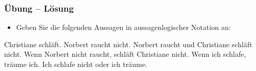 

\begin{frame}
\frametitle{Übung -- Lösung}

\begin{itemize}
	\item Geben Sie die folgenden Aussagen in aussagenlogischer Notation an:
\end{itemize}

\begin{exe}
	 Christiane schläft. \hfill {}
	 Norbert raucht nicht. \hfill {}
	 Norbert raucht und Christiane schläft nicht. \hfill {}
	 Wenn Norbert nicht raucht, schläft Christiane nicht. \hfill {}
	 Wenn ich schlafe, träume ich. \hfill {}
	 Ich schlafe nicht oder ich träume. \hfill {}
\end{exe}

\end{frame}
